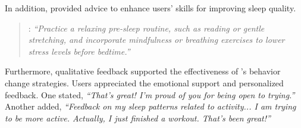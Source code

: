 In addition, \name{} provided advice to enhance users' skills for improving sleep quality.
\begin{quote}
\name{}: \textit{``Practice a relaxing pre-sleep routine, such as reading or gentle stretching, and incorporate mindfulness or breathing exercises to lower stress levels before bedtime.''}
\end{quote}

Furthermore, qualitative feedback supported the effectiveness of \name{}'s behavior change strategies. Users appreciated the emotional support and personalized feedback. One stated, \textit{``That's great! I'm proud of you for being open to trying.'' }
Another added, \textit{``Feedback on my sleep patterns related to activity... I am trying to be more active. Actually, I just finished a workout. That's been great!''}

